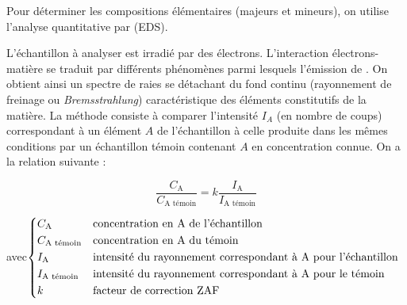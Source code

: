 Pour déterminer les compositions élémentaires (majeurs et mineurs), 
on utilise l'analyse quantitative par \EDS (EDS).

L'échantillon à analyser est irradié par des électrons. L'interaction 
électrons-matière se traduit par différents phénomènes parmi lesquels 
l'émission de \RX. On obtient ainsi un spectre de raies se détachant 
du fond continu (rayonnement de freinage ou \emph{Bremsstrahlung}) 
caractéristique des éléments constitutifs de la matière. La méthode 
consiste à comparer l'intensité $I_A$ (en nombre de coups) 
correspondant à un élément $A$ de l'échantillon à celle produite 
dans les mêmes conditions par un échantillon témoin contenant $A$ 
en concentration connue. On a la relation suivante :

\begin{equation}
  \frac{C_\text{A}}{C_\text{A témoin}} = 
                      k \frac{I_\text{A}}{I_\text{A témoin}}
\end{equation}

\medskip

\noindent
avec\quad $%
  \begin{dcases*}
    C_\text{A}        & concentration en~A de l'échantillon\\
    C_\text{A témoin} & concentration en~A du témoin\\
    I_\text{A}        & intensité du rayonnement correspondant 
                        à~A pour l'échantillon\\
    I_\text{A témoin} & intensité du rayonnement correspondant 
                        à~A pour le témoin\\
    k                 & facteur de correction ZAF
  \end{dcases*}$

\bigskip


